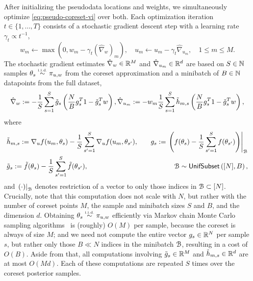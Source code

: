 After initializing the pseudodata locations and weights,
we simultaneously optimize \cref{eq:pseudo-coreset-vi} over both.
Each optimization iteration $t\in \{1, \dots, T\}$ consists of a stochastic gradient descent step
with a learning rate $\gamma_t \propto t^{-1}$,  
\[
w_m \gets \max\left(0, w_m - \gamma_t (\hat\nabla_{w})_m\right),
\quad u_m \gets u_{m} - \gamma_t \hat\nabla_{u_{m}},
\quad 1\leq m \leq M.
\label{eq:gd-update}
\]
The stochastic gradient estimates $\hat\nabla_w \in \mathbb{R}^M$ and $\hat\nabla_{u_m} \in \mathbb{R}^d$
are based on $S\in\mathbb{N}$ samples $\theta_s \distiid \pi_{u,w}$ from the coreset approximation
and a minibatch of $B\in\mathbb{N}$ datapoints from the full dataset,
\[
\hat\nabla_w := -\frac{1}{S}\sum_{s=1}^{S} \tilde{g}_s \left(\frac{N}{B}g_s^T 1  -  \tilde{g}_s^Tw  \right) \label{eq:weight-optimization-mc}, \quad \\
 \hat\nabla_{u_m} := - w_m \frac{1}{S}\sum_{s=1}^{S} \tilde{h}_{m,s}  \left(\frac{N}{B}g_s^T 1 - \tilde{g}_s^T w \right), \label{eq:location-optimization-mc-cov}
\]
where
\[
\begin{aligned}
& \tilde{h}_{m,s} :=\nabla_u f(u_m, \theta_s) - \frac{1}{S} \sum_{s'=1}^{S}\nabla_u f(u_m, \theta_{s'}),
\quad & g_s := \left. \left(f(\theta_s) - \frac{1}{S} \sum_{s'=1}^{S} f(\theta_{s'})\right)\right|_{\mathcal{B}}\\
& \tilde{g}_s := \tilde{f}(\theta_s) - \frac{1}{S} \sum_{s'=1}^{S} \tilde{f}(\theta_{s'}),
\quad & \mathcal{B} \sim {\sf{UnifSubset}}\left([N], B\right),
\end{aligned}\label{eq:gradparts}
\] 
and $\left.(\cdot)\right|_{\mathcal{B}}$ denotes restriction of a vector to only those indices in $\mathcal{B}\subset[N]$.
Crucially, note that this computation does not scale with $N$, but rather with the number
of coreset points $M$, the sample and minibatch sizes $S$ and $B$, and the dimension $d$.
Obtaining $\theta_s\distiid \pi_{u,w}$ efficiently via Markov chain Monte Carlo sampling
algorithms~\citep{hoffman14,jacob17} is (roughly) $O(M)$ per sample, because the coreset is always of size $M$;
and we need not compute
the entire vector $g_s\in\mathbb{R}^N$ per sample $s$, but rather only those $B\ll N$ indices in the minibatch $\mathcal{B}$,
resulting in a cost of $O(B)$.
Aside from that, all computations involving $\tilde{g}_s\in\mathbb{R}^M$ and $\tilde{h}_{m,s}\in\mathbb{R}^d$ are at most $O(Md)$.
Each of these computations are repeated $S$ times over the coreset posterior samples.


